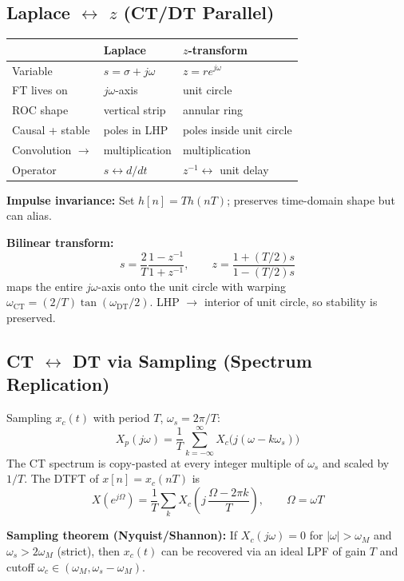 \documentclass[10pt]{article}
\begin{document}
\subsection{Laplace $\leftrightarrow$ $z$ (CT/DT Parallel)}
\begin{center}
\begin{tabular}{@{}lll@{}}
\toprule
& Laplace & $z$-transform \\ \midrule
Variable & $s = \sigma + j\omega$ & $z = re^{j\omega}$ \\
FT lives on & $j\omega$-axis & unit circle \\
ROC shape & vertical strip & annular ring \\
Causal + stable & poles in LHP & poles inside unit circle \\
Convolution $\to$ & multiplication & multiplication \\
Operator & $s \leftrightarrow d/dt$ & $z^{-1}\leftrightarrow$ unit delay \\
\bottomrule
\end{tabular}
\end{center}

\textbf{Impulse invariance:} Set $h[n] = T h(nT)$; preserves time-domain shape but can alias.

\textbf{Bilinear transform:}
\[
s = \frac{2}{T}\frac{1 - z^{-1}}{1 + z^{-1}},\qquad
z = \frac{1 + (T/2)s}{1 - (T/2)s}
\]
maps the entire $j\omega$-axis onto the unit circle with warping $\omega_{\text{CT}} = (2/T)\tan(\omega_{\text{DT}}/2)$. LHP $\to$ interior of unit circle, so stability is preserved.

\subsection{CT $\leftrightarrow$ DT via Sampling (Spectrum Replication)}
Sampling $x_c(t)$ with period $T$, $\omega_s = 2\pi/T$:
\[
\boxed{\,X_p(j\omega) = \frac{1}{T}\sum_{k=-\infty}^{\infty} X_c\bigl(j(\omega - k\omega_s)\bigr)\,}
\]
The CT spectrum is copy-pasted at every integer multiple of $\omega_s$ and scaled by $1/T$. The DTFT of $x[n] = x_c(nT)$ is
\[
X(e^{j\Omega}) = \frac{1}{T}\sum_k X_c\!\left(j\,\frac{\Omega - 2\pi k}{T}\right),\qquad \Omega = \omega T
\]

\textbf{Sampling theorem (Nyquist/Shannon):} If $X_c(j\omega) = 0$ for $|\omega|>\omega_M$ and $\omega_s > 2\omega_M$ (strict), then $x_c(t)$ can be recovered via an ideal LPF of gain $T$ and cutoff $\omega_c \in (\omega_M, \omega_s - \omega_M)$.
\end{document}
